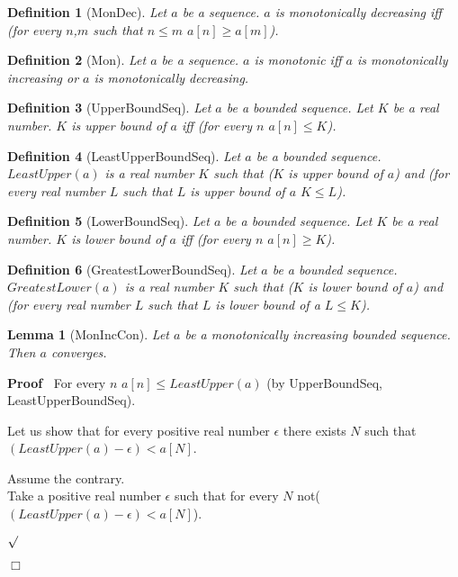 \documentclass{article}
\newenvironment{forthel}{\begin{leftbar}}{\end{leftbar}}
\newenvironment{proof}{\noindent\textbf{Proof\ }}{\hspace*{\fill}$\Box$\medskip}
\newenvironment{subproof}{\begin{list}{}{}
		\item[\text{Proof}]}{\hfill $\surd$ \end{list}}
\newtheorem{lemma}{Lemma}
\newtheorem{definition}{Definition}
\begin{document}
\begin{forthel}
	\begin{definition}[MonDec]
		Let $a$ be a sequence. $a$ is monotonically decreasing iff (for every $n$,$m$ such that $n \leq m$ $a[n] \geq a[m]$).
	\end{definition}
	
	\begin{definition}[Mon]
		Let $a$ be a sequence. $a$ is monotonic iff $a$ is monotonically increasing or $a$ is monotonically decreasing.
	\end{definition}
	
	\begin{definition}[UpperBoundSeq]
		Let $a$ be a bounded sequence. Let $K$ be a real number. $K$ is upper bound of $a$ iff (for every $n$ $a[n] \leq K$).
	\end{definition}
	
	\begin{definition}[LeastUpperBoundSeq]
		Let $a$ be a bounded sequence. $LeastUpper(a)$ is a real number $K$ such that ($K$ is upper bound of $a$) and 
		(for every real number $L$ such that $L$ is upper bound of $a$ $K \leq L$).
	\end{definition}
	
	\begin{definition}[LowerBoundSeq]
		Let $a$ be a bounded sequence. Let $K$ be a real number. $K$ is lower bound of $a$ iff (for every $n$ $a[n] \geq K$).
	\end{definition}
	
	\begin{definition}[GreatestLowerBoundSeq]
		Let $a$ be a bounded sequence. $GreatestLower(a)$ is a real number $K$ such that ($K$ is lower bound of $a$) and
		(for every real number $L$ such that $L$ is lower bound of a $L \leq K$).
	\end{definition}
	
	\begin{lemma}[MonIncCon]
		Let $a$ be a monotonically increasing bounded sequence. Then $a$ converges.
	\end{lemma}
	
	\begin{proof}
		For every $n$ $a[n] \leq LeastUpper(a)$ (by UpperBoundSeq, LeastUpperBoundSeq).

		\noindent Let us show that for every positive real number $\epsilon$ there exists $N$ such that $(LeastUpper(a) - \epsilon) < a[N]$.
		\begin{subproof}
			Assume the contrary.\\
			Take a positive real number $\epsilon$ such that for every $N$ not($(LeastUpper(a) - \epsilon) < a[N]$).
			

\end{subproof}
\end{proof}
\end{forthel}
\end{document}
